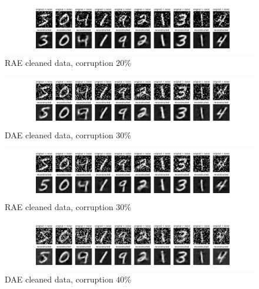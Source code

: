 \documentclass{beamer}
\theoremstyle{plain}
\theoremstyle{definition}
\theoremstyle{remark}
\begin{document}
\begin{frame}
	\begin{figure}
		\centering
		\includegraphics[width=0.95\linewidth]{Images/lam20.0corr0.2/RAE_recon.png}
		\caption[]{RAE cleaned data, corruption $20\%$}
	\end{figure}
\end{frame}

\begin{frame}
	\begin{figure}
		\centering
		\includegraphics[width=0.95\linewidth]{Images/lam20.0corr0.3/DAE_recon.png}
		\caption[]{DAE cleaned data, corruption $30\%$}
	\end{figure}
\end{frame}

\begin{frame}
	\begin{figure}
		\centering
		\includegraphics[width=0.95\linewidth]{Images/lam20.0corr0.3/RAE_recon.png}
		\caption[]{RAE cleaned data, corruption $30\%$}
	\end{figure}
\end{frame}

\begin{frame}
	\begin{figure}
		\centering
		\includegraphics[width=0.95\linewidth]{Images/lam20.0corr0.4/DAE_recon.png}
		\caption[]{DAE cleaned data, corruption $40\%$}
	\end{figure}
\end{frame}
\end{document}
